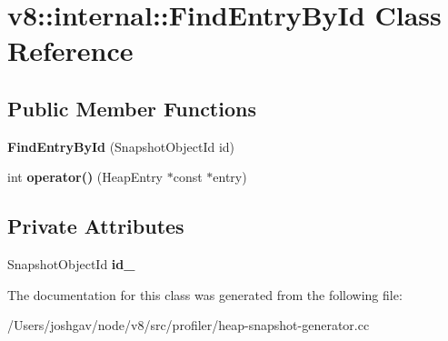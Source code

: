 \hypertarget{classv8_1_1internal_1_1_find_entry_by_id}{}\section{v8\+:\+:internal\+:\+:Find\+Entry\+By\+Id Class Reference}
\label{classv8_1_1internal_1_1_find_entry_by_id}
\subsection*{Public Member Functions}
\begin{DoxyCompactItemize}
\item 
{\bfseries Find\+Entry\+By\+Id} (Snapshot\+Object\+Id id)\hypertarget{classv8_1_1internal_1_1_find_entry_by_id_ac6a391bb6eb3d715857eed651ddc43d8}{}\label{classv8_1_1internal_1_1_find_entry_by_id_ac6a391bb6eb3d715857eed651ddc43d8}

\item 
int {\bfseries operator()} (Heap\+Entry $\ast$const $\ast$entry)\hypertarget{classv8_1_1internal_1_1_find_entry_by_id_a341a173ff06bf66fd71c0fa5c1c80be3}{}\label{classv8_1_1internal_1_1_find_entry_by_id_a341a173ff06bf66fd71c0fa5c1c80be3}

\end{DoxyCompactItemize}
\subsection*{Private Attributes}
\begin{DoxyCompactItemize}
\item 
Snapshot\+Object\+Id {\bfseries id\+\_\+}\hypertarget{classv8_1_1internal_1_1_find_entry_by_id_a7f0424a1c6bd8a036d530504ade0a7bf}{}\label{classv8_1_1internal_1_1_find_entry_by_id_a7f0424a1c6bd8a036d530504ade0a7bf}

\end{DoxyCompactItemize}


The documentation for this class was generated from the following file\+:\begin{DoxyCompactItemize}
\item 
/\+Users/joshgav/node/v8/src/profiler/heap-\/snapshot-\/generator.\+cc\end{DoxyCompactItemize}
